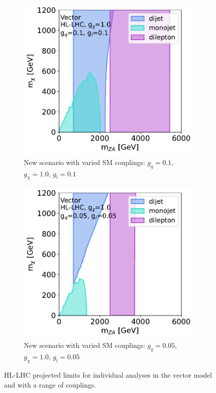 \documentclass[11pt]{article}
\begin{document}
\begin{figure}
     \begin{subfigure}[b]{0.49\textwidth}
         \centering
         \includegraphics[width=\textwidth]{SummaryPlots-EF10/figures/massmass/hl-lhc/massmass_vector_gq0.1_gdm1.0_gl0.1.pdf}
         \caption{New scenario with varied SM couplings: $g_q=0.1$, $g_{\chi}=1.0$, $g_l=0.1$}
         \label{subfig:vector-hl-lhc-biggerlepton}
     \end{subfigure}
     \hfill
     \begin{subfigure}[b]{0.49\textwidth}
         \centering
         \includegraphics[width=\textwidth]{SummaryPlots-EF10/figures/massmass/hl-lhc/massmass_vector_gq0.05_gdm1.0_gl0.05.pdf}
         \caption{New scenario with varied SM couplings: $g_q=0.05$, $g_{\chi}=1.0$, $g_l=0.05$}
         \label{subfig:vector-hl-lhc-allsmall}       
     \end{subfigure}
        \caption{HL-LHC projected limits for individual analyses in the vector model and with a range of couplings.}
        \label{fig:hl-lhc-massmass-separate}
\end{figure}
\end{document}
